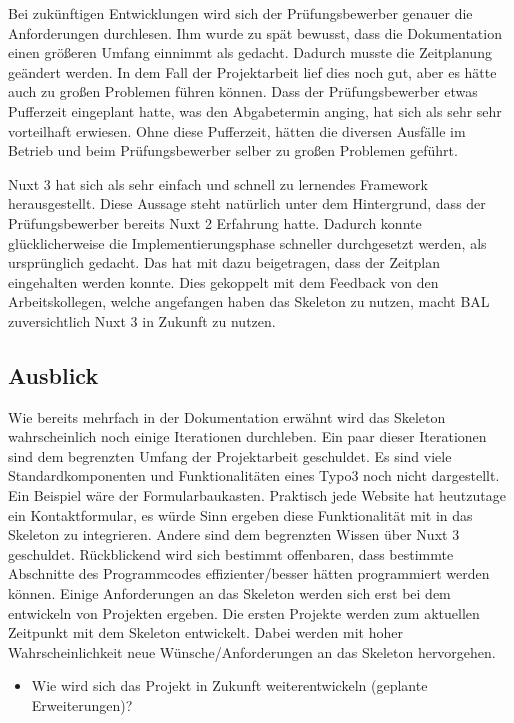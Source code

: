 Bei zukünftigen Entwicklungen wird sich der Prüfungsbewerber genauer die Anforderungen durchlesen. Ihm wurde zu spät bewusst, dass die Dokumentation einen größeren Umfang einnimmt als gedacht. Dadurch musste die Zeitplanung geändert werden. In dem Fall der Projektarbeit lief dies noch gut, aber es hätte auch zu großen Problemen führen können. Dass der Prüfungsbewerber etwas Pufferzeit eingeplant hatte, was den Abgabetermin anging, hat sich als sehr sehr vorteilhaft erwiesen. Ohne diese Pufferzeit, hätten die diversen Ausfälle im Betrieb und beim Prüfungsbewerber selber zu großen Problemen geführt.

Nuxt 3 hat sich als sehr einfach und schnell zu lernendes Framework herausgestellt. Diese Aussage steht natürlich unter dem Hintergrund, dass der Prüfungsbewerber bereits Nuxt 2 Erfahrung hatte. Dadurch konnte glücklicherweise die Implementierungsphase schneller durchgesetzt werden, als ursprünglich gedacht. Das hat mit dazu beigetragen, dass der Zeitplan eingehalten werden konnte. Dies gekoppelt mit dem Feedback von den Arbeitskollegen, welche angefangen haben das Skeleton zu nutzen, macht \acs{BAL} zuversichtlich Nuxt 3 in Zukunft zu nutzen.

\subsection{Ausblick}
\label{sec:Ausblick}

Wie bereits mehrfach in der Dokumentation erwähnt wird das Skeleton wahrscheinlich noch einige Iterationen durchleben. Ein paar dieser Iterationen sind dem begrenzten Umfang der Projektarbeit geschuldet. Es sind viele Standardkomponenten und Funktionalitäten eines Typo3 noch nicht dargestellt. Ein Beispiel wäre der Formularbaukasten. Praktisch jede Website hat heutzutage ein Kontaktformular, es würde Sinn ergeben diese Funktionalität mit in das Skeleton zu integrieren. Andere sind dem begrenzten Wissen über Nuxt 3 geschuldet. Rückblickend wird sich bestimmt offenbaren, dass bestimmte Abschnitte des Programmcodes effizienter/besser hätten programmiert werden können. Einige Anforderungen an das Skeleton werden sich erst bei dem entwickeln von Projekten ergeben. Die ersten Projekte werden zum aktuellen Zeitpunkt mit dem Skeleton entwickelt. Dabei werden mit hoher Wahrscheinlichkeit neue Wünsche/Anforderungen an das Skeleton hervorgehen.

\begin{itemize}
	\item Wie wird sich das Projekt in Zukunft weiterentwickeln (\zB geplante Erweiterungen)?
\end{itemize}
